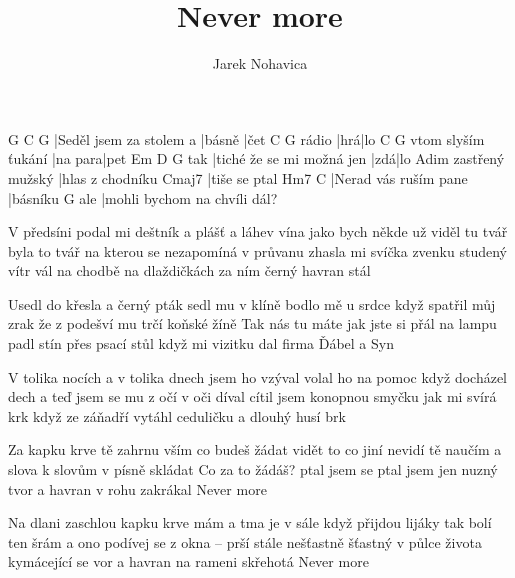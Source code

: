 \documentclass{song}
\author{Jarek Nohavica}
\title{Never more}
\begin{document}
\begin{multicols}{2}

\strophe
G                       C      G
|Seděl jsem za stolem a |básně |čet
      C   G
rádio |hrá|lo
                   C       G
vtom slyším ťukání |na para|pet
    Em                        D   G
tak |tiché že se mi možná jen |zdá|lo
                Adim
zastřený mužský |hlas z chodníku
Cmaj7
|tiše se ptal
Hm7                   C
|Nerad vás ruším pane |básníku
    G
ale |mohli bychom na chvíli dál?
\endstrophe

\strophe*
V předsíni podal mi deštník a plášť
a láhev vína
jako bych někde už viděl tu tvář
byla to tvář na kterou se nezapomíná
v průvanu zhasla mi svíčka
zvenku studený vítr vál
na chodbě na dlaždičkách
za ním černý havran stál
\endstrophe

\strophe*
Usedl do křesla a černý pták
sedl mu v klíně
bodlo mě u srdce když spatřil můj zrak
že z podešví mu trčí koňské žíně
Tak nás tu máte jak jste si přál
na lampu padl stín
přes psací stůl když mi vizitku dal
firma Ďábel a Syn
\endstrophe

\columnbreak

\strophe*
V tolika nocích a v tolika dnech
jsem ho vzýval
volal ho na pomoc když docházel dech
a teď jsem se mu z očí v oči díval
cítil jsem konopnou smyčku
jak mi svírá krk
když ze záňadří vytáhl ceduličku
a dlouhý husí brk
\endstrophe

\strophe*
Za kapku krve tě zahrnu vším
co budeš žádat
vidět to co jiní nevidí tě naučím
a slova k slovům v písně skládat
Co za to žádáš? ptal jsem se ptal
jsem jen nuzný tvor
a havran v rohu zakrákal
Never more
\endstrophe

\strophe*
Na dlani zaschlou kapku krve mám
a tma je v sále
když přijdou lijáky tak bolí ten šrám
a ono podívej se z okna -- prší stále
nešťastně šťastný v půlce života
kymácející se vor
a havran na rameni skřehotá
Never more
\endstrophe

\end{multicols}
\end{document}
